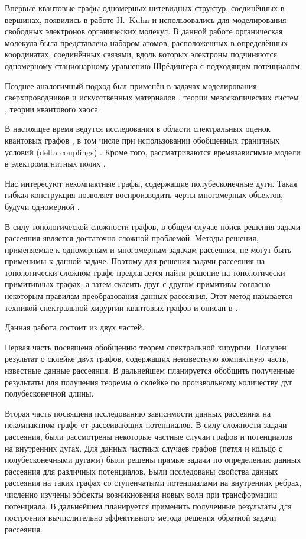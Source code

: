 \documentclass[a4 paper, 12 pt]{extarticle}
\begin{document}
	Впервые квантовые графы одномерных нитевидных структур, соединённых в вершинах, появились в работе H.~Kuhn \cite{Kuhn} и использовались для моделирования свободных электронов органических молекул. В данной работе органическая молекула была представлена набором атомов, расположенных в определённых координатах, соединённых связями, вдоль которых электроны подчиняются одномерному стационарному уравнению Шрёдингера с подходящим потенциалом.
	
	Позднее аналогичный подход был применён в задачах моделирования сверхпроводников  и искусственных материалов \cite{Superconductivity}, теории мезоскопических систем \cite{Kowal}, теории квантового хаоса \cite{QuantumChaos}.
	
	В настоящее время ведутся исследования в области спектральных оценок квантовых графов \cite{SpectralEstimates}, в том числе при использовании обобщённых граничных условий (delta couplings) \cite{deltaCouplings}. Кроме того, рассматриваются времязависимые модели в электромагнитных полях \cite{Popov1, Popov2}.
	
	Нас интересуют некомпактные графы, содержащие полубесконечные дуги. Такая гибкая конструкция позволяет воспроизводить черты многомерных объектов, будучи одномерной \cite{GerasimenkoPavlov}.
	
	В силу топологической сложности графов, в общем случае поиск решения задачи рассеяния является достаточно сложной проблемой. Методы решения, применяемые к одномерным и многомерным задачам рассеяния, не могут быть применимы к данной задаче. Поэтому для решения задачи рассеяния на топологически сложном графе предлагается найти решение на топологически примитивных графах, а затем склеить друг с другом примитивы согласно некоторым правилам преобразования данных рассеяния. Этот метод называется техникой спектральной хирургии квантовых графов и описан в \cite{SpectralSurgery}.
	
	Данная работа состоит из двух частей. 
	
	Первая часть посвящена обобщению теорем спектральной хирургии. Получен результат о склейке двух графов, содержащих неизвестную компактную часть, известные данные рассеяния. В дальнейшем планируется обобщить полученные результаты для получения теоремы о склейке по произвольному количеству дуг полубесконечной длины.
	
	Вторая часть посвящена исследованию зависимости данных рассеяния на некомпактном графе от рассеивающих потенциалов. В силу сложности задачи рассеяния, были рассмотрены некоторые частные случаи графов и потенциалов на внутренних дугах. Для данных частных случаев графов (петля и кольцо с полубесконечными дугами) были решены прямые задачи по определению данных рассеяния для различных потенциалов. Были исследованы свойства данных рассеяния на таких графах со ступенчатыми потенциалами на внутренних ребрах, численно изучены эффекты возникновения новых волн при трансформации потенциала. В дальнейшем планируется применить полученные результаты для построения вычислительно эффективного метода решения обратной задачи рассеяния.
	
\end{document}
